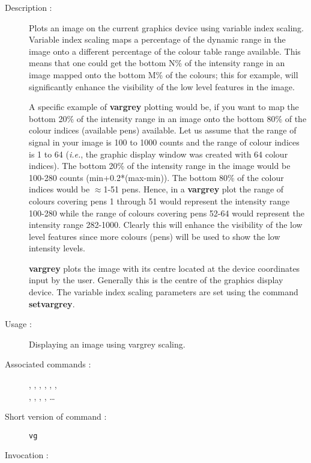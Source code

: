 \begin{description}

\item[Description :] Plots an image on the current graphics device
using variable index scaling.  Variable index scaling maps a percentage
of the dynamic range in the image onto a different percentage of the
colour table range available.  This means that one could get the bottom
N\% of the intensity range in an image mapped onto the bottom M\% of
the colours; this for example, will significantly enhance the
visibility of the low level features in the image.

A specific example of {\bf vargrey} plotting would be, if you want to
map the bottom 20\% of the intensity range in an image onto the bottom
80\% of the colour indices (available pens) available.  Let us assume
that the range of signal in your image is 100 to 1000 counts and the
range of colour indices is 1 to 64 (\emph{i.e.}, the graphic display
window was created with 64 colour indices).  The bottom 20\% of the
intensity range in the image would be 100-280 counts (min+0.2*(max-min)).
The bottom 80\% of the colour indices would be $\approx$1-51 pens.
Hence, in a {\bf vargrey} plot the range of colours covering pens 1
through 51 would represent the intensity range 100-280 while the range
of colours covering pens 52-64 would represent
the intensity range 282-1000.  Clearly this will enhance the visibility
of the low level features since more colours (pens) will be used to
show the low intensity levels.

{\bf vargrey} plots the image with its centre located at the device
coordinates input by the user.  Generally this is the centre of the
graphics display device.  The variable index scaling parameters are set
using the command {\bf setvargrey}.

\item[Usage :] Displaying an image using vargrey scaling.

\item[Associated commands :] {\tt {}},
{\tt {}},
{\tt {}}, {\tt {}},
{\tt {}}, {\tt {}}, \\
{\tt {}}, {\tt {}},
{\tt {}}, {\tt {}}, \ldots

\item[Short version of command :] {\tt vg}
\item[Invocation :]


\end{description}
